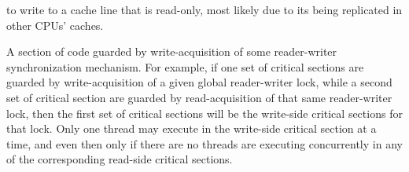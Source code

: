 \begin{description}
	to write to a cache line that is read-only, most likely due
	to its being replicated in other CPUs' caches.
\item[\IXh{Write-Side Critical Section}{Critical section}{write-side}:]
	A section of code guarded by write-acquisition of
	some reader-writer synchronization mechanism.
	For example, if one set of critical sections are guarded by
	write-acquisition of
	a given global reader-writer lock, while a second set of critical
	section are guarded by read-acquisition of that same reader-writer
	lock, then the first set of critical sections will be the
	write-side critical sections for that lock.
	Only one thread may execute in the write-side critical section
	at a time, and even then only if there are no threads are
	executing concurrently in any of the corresponding read-side
	critical sections.
\end{description}
